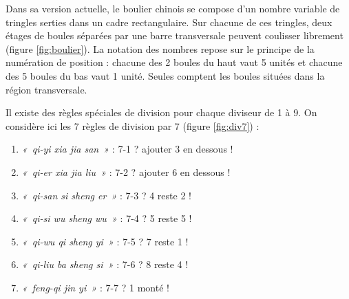 \begin{td}\label{td:boulier}
Dans sa version actuelle, le boulier chinois se compose d'un nombre variable de tringles
serties dans un cadre rectangulaire. Sur chacune de ces tringles, deux étages de boules
séparées par une barre transversale peuvent coulisser librement (figure \ref{fig:boulier}).
La notation des nombres repose sur le principe de la numération de position : chacune
des 2 boules du haut vaut 5 unités et chacune des 5 boules du bas vaut 1 unité. Seules
comptent les boules situées dans la région transversale.

Il existe des règles spéciales de division pour chaque diviseur de 1 à 9.
On consid\`ere ici les 7 r\`egles de division par 7 (figure \ref{fig:div7}) :

\noindent\begin{minipage}[t]{7.5cm}\footnotesize
\begin{enumerate}
\item {\em «~qi-yi xia jia san~»} : 7-1 ? ajouter 3 en dessous !
\item {\em «~qi-er xia jia liu~»} : 7-2 ? ajouter 6 en dessous !
\item {\em «~qi-san si sheng er~»} : 7-3 ? 4 reste 2 !
\end{enumerate}
\end{minipage}\hfill
\begin{minipage}[t]{7.5cm}\footnotesize
\begin{enumerate}\setcounter{enumi}{3}
\item {\em «~qi-si wu sheng wu~»} : 7-4 ? 5 reste 5 !
\item {\em «~qi-wu qi sheng yi~»} : 7-5 ? 7 reste 1 !
\item {\em «~qi-liu ba sheng si~»} : 7-6 ? 8 reste 4 !
\item {\em «~feng-qi jin yi~»} : 7-7 ? 1 monté !
\end{enumerate}
\end{minipage}



\end{td}
